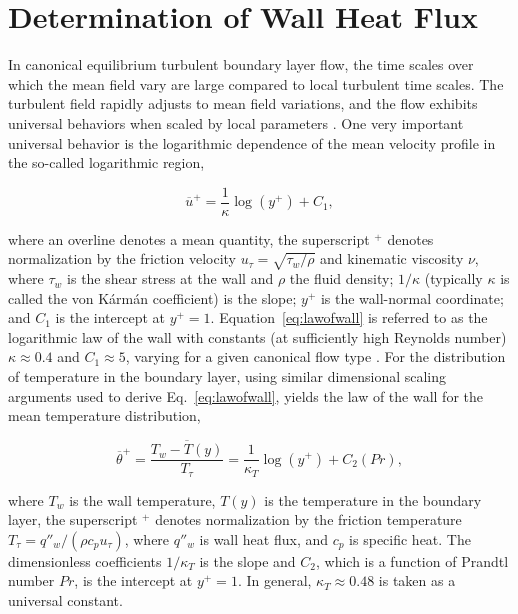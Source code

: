 \section{Determination of Wall Heat Flux}



In canonical equilibrium turbulent boundary layer flow, the time scales over which the mean field vary are large compared to local turbulent time scales. The turbulent field rapidly adjusts to mean field variations, and the flow exhibits universal behaviors when scaled by local parameters \cite{townsend1976}. One very important universal behavior is the logarithmic dependence of the mean velocity profile in the so-called logarithmic region,

\begin{equation}
{\overline u^+}=\frac{1}{\kappa}\log(y^+)+C_1, \label{eq:lawofwall}
\end{equation}

\noindent  where an overline denotes a mean quantity, the superscript $^+$ denotes normalization by the friction velocity $u_\tau = \sqrt{\tau_w / \rho}$ and kinematic viscosity $\nu$, where $\tau_w$ is the shear stress at the wall and $\rho$ the fluid density; $1/\kappa$ (typically $\kappa$ is called the von K\'{a}rm\'{a}n coefficient) is the slope; $y^+$ is the wall-normal coordinate; and $C_1$ is the intercept at $y^+ = 1$. Equation~\ref{eq:lawofwall} is referred to as the logarithmic law of the wall with constants (at sufficiently high Reynolds number) $\kappa\approx0.4$ and $C_1\approx5$, varying for a given canonical flow type \cite{Nagib2008}. For the distribution of temperature in the boundary layer, using similar dimensional scaling arguments used to derive Eq.~\ref{eq:lawofwall}, yields the law of the wall for the mean temperature distribution,

\begin{equation}
{\overline \theta^+ } =  \overline{\frac{T_w - T(y)}{T_\tau}} = \frac{1}{\kappa_T}\log(y^+)+C_2(Pr), \label{eq:lawofwallT}
\end{equation}

\noindent where $T_w$ is the wall temperature, $T(y)$ is the temperature in the boundary layer, the superscript $^+$ denotes normalization by the friction temperature $T_\tau = q''_w / (\rho c_p u_\tau)$, where $q''_w$ is wall heat flux, and $c_p$ is specific heat. The dimensionless coefficients $1/\kappa_T$ is the slope and $C_2$, which is a function of Prandtl number $Pr$, is the intercept at $y^+=1$. In general, $\kappa_T \approx 0.48$ is taken as a universal constant.  

